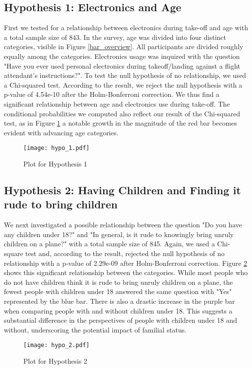 \documentclass{article}
\theoremstyle{plain}
\theoremstyle{definition}
\theoremstyle{remark}
\begin{document}
\subsection{Hypothesis 1: Electronics and Age}

First we tested for a relationship between electronics during take-off and age with a total sample size of 843. In the survey, age was divided into four distinct categories, visible in Figure \ref{bar_overview}. All participants are divided roughly equally among the categories. Electronics usage was inquired with the question "Have you ever used personal electronics during takeoff/landing against a flight attendant's instructions?". To test the null hypothesis of no relationship, we used a Chi-squared test. According to the result, we reject the null hypothesis with a p-value of 4.54e-10 after the Holm-Bonferroni correction. We thus find a significant relationship between age and electronics use during take-off. The conditional probabilities we computed also reflect our result of the Chi-squared test, as in Figure \ref{hypothesis1} a notable growth in the magnitude of the red bar becomes evident with advancing age categories.
\begin{figure}[h]
    \texttt{[image: hypo\_1.pdf]}
    \caption{Plot for Hypothesis 1}
    \label{hypothesis1}
\end{figure}


\subsection{Hypothesis 2: Having Children and Finding it rude to bring children}
We next investigated a possible relationship between the question "Do you have any children under 18?" and "In general, is it rude to knowingly bring unruly children on a plane?" with a total sample size of 845. Again, we used a Chi-square test and, according to the result, rejected the null hypothesis of no relationship with a p-value of 2.29e-09 after Holm-Bonferroni correction. Figure \ref{hypothesis2} shows this significant relationship between the categories.  While most people who do not have children think it is rude to bring unruly children on a plane, the fewest people with children under 18 answered the same question with "Yes" represented by the blue bar. There is also a drastic increase in the purple bar when comparing people with and without children under 18. This suggests a substantial difference in the perspectives of people with children under 18 and without, underscoring the potential impact of familial status.
\begin{figure}[h]
    \texttt{[image: hypo\_2.pdf]}
    \caption{Plot for Hypothesis 2}
    \label{hypothesis2}
\end{figure}
\end{document}
